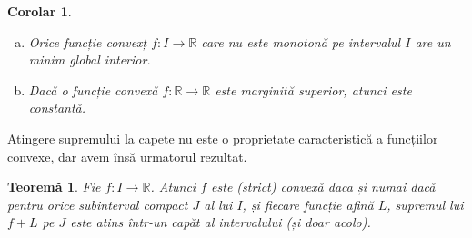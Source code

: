 \documentclass[a4paper,12pt,oneside]{report}
\newtheorem{theorem}{Teorem\u a}
\newtheorem{corollary}{Corolar}
\begin{document}
\begin{corollary}
\begin{enumerate}[a)]
\item Orice funcție convexț \(f: I \rightarrow \mathbb{R}\) care nu este monotonă pe
intervalul \(I\) are un minim global interior.
\item Dacă o funcție convexă \(f: \mathbb{R} \rightarrow \mathbb{R}\) este marginită superior, atunci este constantă.
\end{enumerate}
\end{corollary}
Atingere supremului la capete nu este o proprietate caracteristică a funcțiilor convexe, dar avem însă urmatorul rezultat.

\begin{theorem}

Fie \(f: I \rightarrow \mathbb{R}\). Atunci \(f\) este (strict) convexă daca și numai dacă pentru orice subinterval compact \(J\) al lui \(I\), și fiecare funcție afină \(L\), supremul lui \(f+L\) pe \(J\) este atins într-un capăt al intervalului (și doar acolo).
\end{theorem}
\end{document}
